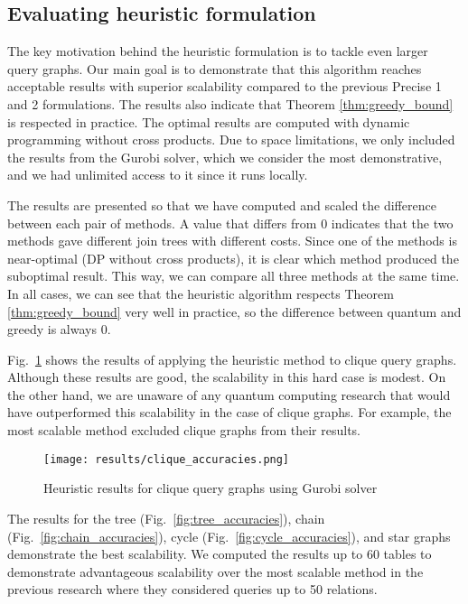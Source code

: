 \subsection{Evaluating heuristic formulation}

The key motivation behind the heuristic formulation is to tackle even larger query graphs. Our main goal is to demonstrate that this algorithm reaches acceptable results with superior scalability compared to the previous Precise 1 and 2 formulations. The results also indicate that Theorem \ref{thm:greedy_bound} is respected in practice. The optimal results are computed with dynamic programming without cross products. Due to space limitations, we only included the results from the Gurobi solver, which we consider the most demonstrative, and we had unlimited access to it since it runs locally. 

The results are presented so that we have computed and scaled the difference between each pair of methods. A value that differs from 0 indicates that the two methods gave different join trees with different costs. Since one of the methods is near-optimal (DP without cross products), it is clear which method produced the suboptimal result. This way, we can compare all three methods at the same time. In all cases, we can see that the heuristic algorithm respects Theorem \ref{thm:greedy_bound} very well in practice, so the difference between quantum and greedy is always $0$.

Fig.~\ref{fig:clique_accuracies} shows the results of applying the heuristic method to clique query graphs. Although these results are good, the scalability in this hard case is modest. On the other hand, we are unaware of any quantum computing research that would have outperformed this scalability in the case of clique graphs. For example, the most scalable method \cite{10.14778/3632093.3632112} excluded clique graphs from their results.

\begin{figure}
    \centering
    \texttt{[image: results/clique\_accuracies.png]}
    \caption{Heuristic results for clique query graphs using Gurobi solver}
    \label{fig:clique_accuracies}
\end{figure}

The results for the tree (Fig.~\ref{fig:tree_accuracies}), chain (Fig.~\ref{fig:chain_accuracies}), cycle (Fig.~\ref{fig:cycle_accuracies}), and star graphs demonstrate the best scalability. We computed the results up to 60 tables to demonstrate advantageous scalability over the most scalable method in the previous research \cite{10.14778/3632093.3632112} where they considered queries up to 50 relations.

